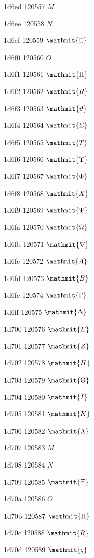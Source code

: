 \documentclass[11pt]{article}
\begin{document}
1d6ed 120557 \ensuremath{M}

1d6ee 120558 \ensuremath{N}

1d6ef 120559 \ensuremath{\mathmit{\Xi}}

1d6f0 120560 \ensuremath{O}

1d6f1 120561 \ensuremath{\mathmit{\Pi}}

1d6f2 120562 \ensuremath{\mathmit{{R}}}

1d6f3 120563 \ensuremath{\mathmit{\vartheta}}

1d6f4 120564 \ensuremath{\mathmit{\Sigma}}

1d6f5 120565 \ensuremath{\mathmit{{T}}}

1d6f6 120566 \ensuremath{\mathmit{\Upsilon}}

1d6f7 120567 \ensuremath{\mathmit{\Phi}}

1d6f8 120568 \ensuremath{\mathmit{{X}}}

1d6f9 120569 \ensuremath{\mathmit{\Psi}}

1d6fa 120570 \ensuremath{\mathmit{\Omega}}

1d6fb 120571 \ensuremath{\mathmit{\nabla}}

1d6fc 120572 \ensuremath{\mathmit{{A}}}

1d6fd 120573 \ensuremath{\mathmit{{B}}}

1d6fe 120574 \ensuremath{\mathmit{\Gamma}}

1d6ff 120575 \ensuremath{\mathmit{\Delta}}

1d700 120576 \ensuremath{\mathmit{{E}}}

1d701 120577 \ensuremath{\mathmit{{Z}}}

1d702 120578 \ensuremath{\mathmit{{H}}}

1d703 120579 \ensuremath{\mathmit{\Theta}}

1d704 120580 \ensuremath{\mathmit{{I}}}

1d705 120581 \ensuremath{\mathmit{{K}}}

1d706 120582 \ensuremath{\mathmit{\Lambda}}

1d707 120583 \ensuremath{M}

1d708 120584 \ensuremath{N}

1d709 120585 \ensuremath{\mathmit{\Xi}}

1d70a 120586 \ensuremath{O}

1d70b 120587 \ensuremath{\mathmit{\Pi}}

1d70c 120588 \ensuremath{\mathmit{{R}}}

1d70d 120589 \ensuremath{\mathmit{\varsigma}}
\end{document}
